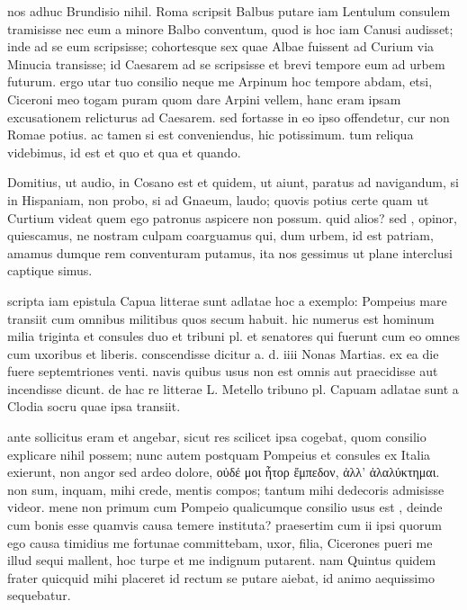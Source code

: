 


 nos adhuc Brundisio nihil. Roma scripsit Balbus putare iam Lentulum consulem tramisisse nec eum a minore Balbo conventum, quod is hoc iam Canusi audisset; inde ad se eum scripsisse; cohortesque sex quae Albae fuissent ad Curium via Minucia transisse; id Caesarem ad se scripsisse et brevi tempore eum ad urbem futurum. ergo utar tuo consilio neque me Arpinum hoc tempore abdam, etsi, Ciceroni meo togam puram quom dare Arpini vellem, hanc eram ipsam excusationem relicturus ad Caesarem. sed fortasse in eo ipso offendetur, cur non Romae potius. ac tamen si est conveniendus, hic potissimum. tum reliqua videbimus, id est et quo et qua et quando.

 Domitius, ut audio, in Cosano est et quidem, ut aiunt, paratus ad navigandum, si in Hispaniam, non probo, si ad Gnaeum, laudo; quovis potius certe quam ut Curtium videat quem ego patronus aspicere non possum. quid alios? sed , opinor, quiescamus, ne nostram culpam coarguamus qui, dum urbem, id est patriam, amamus dumque rem conventuram putamus, ita nos gessimus ut plane interclusi captique simus.

 scripta iam epistula Capua litterae sunt adlatae hoc a exemplo: Pompeius mare transiit cum omnibus militibus quos secum habuit. hic numerus est hominum milia triginta et consules duo et tribuni pl. et senatores qui fuerunt cum eo omnes cum uxoribus et liberis. conscendisse dicitur a. d. iiii Nonas Martias. ex ea die fuere septemtriones venti. navis quibus usus non est omnis aut praecidisse aut incendisse dicunt. de hac re litterae L. Metello tribuno pl. Capuam adlatae sunt a Clodia socru quae ipsa transiit.

 ante sollicitus eram et angebar, sicut res scilicet ipsa cogebat, quom consilio explicare nihil possem; nunc autem postquam Pompeius et consules ex Italia exierunt, non angor sed ardeo dolore, οὐδέ μοι ἦτορ ἔμπεδον, ἀλλ' ἀλαλύκτημαι. non sum, inquam, mihi crede, mentis compos; tantum mihi dedecoris admisisse videor. mene non primum cum Pompeio qualicumque consilio usus est , deinde cum bonis esse quamvis causa temere instituta? praesertim cum ii ipsi quorum ego causa timidius me fortunae committebam, uxor, filia, Cicerones pueri me illud sequi mallent, hoc turpe et me indignum putarent. nam Quintus quidem frater quicquid mihi placeret id rectum se putare aiebat, id animo aequissimo sequebatur.

